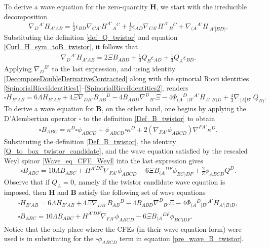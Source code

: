 \documentclass[10pt,a4paper]{article}
\theoremstyle{plain}
\def\bmB{{\bm B}}
\def\bmH{{\bm H}}
\begin{document}
To derive a wave equation for the zero-quantity $\bmH$, we start with the irreducible decomposition
\[
\nabla_{D}{}^{A'}H_{A'AB} = \tfrac{1}{3} \epsilon _{BD}
\nabla_{CA'}H^{A'}{}_{A}{}^{C} + \tfrac{1}{3} \epsilon _{AD}
\nabla_{CA'}H^{A'}{}_{B}{}^{C} + \nabla_{(A}{}^{A'}H_{|A'|BD)}.
\]
Substituting the definition \eqref{def_Q_twistor} and equation
\eqref{Curl_H_sym_toB_twistor}, it follows that
\begin{align}\label{derH_twistor_toBandQ}
\nabla_{D}{}^{A'}H_{A'AB} = 2 \Xi B_{ABD}  + \tfrac{1}{3} Q_{B}
\epsilon _{AD} + \tfrac{1}{3} Q_{A} \epsilon _{BD}.
\end{align}
Applying $\nabla_{D}{}^{B'}$ to the last expression, and using
identity \eqref{DecomposeDoubleDerivativeContracted} along with the
spinorial Ricci identities
\eqref{SpinorialRicciIdentities1}--\eqref{SpinorialRicciIdentities2},
renders
\begin{equation}\label{wave_H_twistor}
  \square H_{B'AB} = 6 \Lambda H_{B'AB} + 4 \Xi
  \nabla_{DB'}B_{AB}{}^{D} -4 B_{ABD} \nabla^{D}{}_{B'}\Xi -4
  \Phi_{(A}{}^{D}{}_{|B'}{}^{A'}H_{A'|B)D} + \tfrac{4}{3}
  \nabla_{(A|B'|}Q_{B)}.
\end{equation}
To derive a wave equation for $\bmB$, on the other hand, one begins by applying the D'Alembertian
operator $\square$ to the definition \eqref{Def_B_twistor} to obtain
\begin{align}\label{pre_wave_B_twistor}
\square B_{ABC} = \kappa ^{D} \square \phi _{ABCD} + \phi _{ABCD}
\square \kappa ^{D} + 2 (\nabla_{FA'}\phi _{ABCD}) \nabla^{FA'}\kappa
^{D}.
\end{align}
Substituting the definition \eqref{Def_B_twistor}, the identity
\eqref{Q_to_box_twistor_candidate}, and the wave equation satisfied by
the rescaled Weyl spinor \eqref{Wave_eq_CFE_Weyl} into the last
expression gives
\begin{equation}\label{wave_B_twistor}
\square B_{ABC} = 10 \Lambda B_{ABC} + H^{A'DF} \nabla_{FA'}\phi
_{ABCD} -6 \Xi B_{(A}{}^{DF}\phi _{BC)DF} + \tfrac{2}{3} \phi _{ABCD}
Q^{D}.
\end{equation}
Observe that if $Q_{A}=0$, namely if the twistor candidate wave
equation is imposed, then $\bmH$ and $\bmB$ satisfy the following set
of wave equations
\begin{subequations}
\begin{eqnarray}
  && \square H_{B'AB} = 6 \Lambda H_{B'AB} + 4 \Xi
  \nabla_{DB'}B_{AB}{}^{D}  -4 B_{ABD} \nabla^{D}{}_{B'}\Xi   -4 \Phi_{(A}{}^{D}{}_{|B'}{}^{A'}H_{A'|B)D},\qquad
   \label{Hom_wave_HandB1} \\
 && \square B_{ABC} = 10\Lambda B_{ABC} + H^{A'DF} \nabla_{FA'}\phi _{ABCD}  -6 \Xi B_{(A}{}^{DF}\phi
_{BC)DF}.  \label{Hom_wave_HandB2}
\end{eqnarray}
\end{subequations}
Notice that the only place where the CFEs (in their wave equation
form) were used is in substituting for the $\square \phi _{ABCD}$ term
in equation \eqref{pre_wave_B_twistor}.  \\
\end{document}
